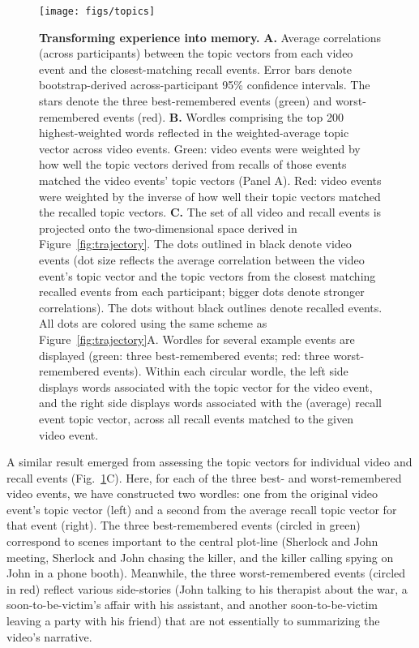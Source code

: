 \documentclass{article}
\begin{document}
\begin{figure}[tp]
\centering
\texttt{[image: figs/topics]}
\caption{\small \textbf{Transforming experience into memory.} \textbf{A.} Average correlations (across participants) between the topic vectors from each video event and the closest-matching recall events.  Error bars denote bootstrap-derived across-participant 95\% confidence intervals.  The stars denote the three best-remembered events (green) and worst-remembered events (red).  \textbf{B.} Wordles comprising the top 200 highest-weighted words reflected in the weighted-average topic vector across video events.  Green: video events were weighted by how well the topic vectors derived from recalls of those events matched the video events' topic vectors (Panel A).  Red: video events were weighted by the inverse of how well their topic vectors matched the recalled topic vectors.  \textbf{C.}  The set of all video and recall events is projected onto the two-dimensional space derived in Figure~\ref{fig:trajectory}.  The dots outlined in black denote video events (dot size reflects the average correlation between the video event's topic vector and the topic vectors from the closest matching recalled events from each participant; bigger dots denote stronger correlations).  The dots without black outlines denote recalled events.  All dots are colored using the same scheme as Figure~\ref{fig:trajectory}A.  Wordles for several example events are displayed (green: three best-remembered events; red: three worst-remembered events).  Within each circular wordle, the left side displays words associated with the topic vector for the video event, and the right side displays words associated with the (average) recall event topic vector, across all recall events matched to the given video event.}
\label{fig:topics}
\end{figure}

A similar result emerged from assessing the topic vectors for individual video and recall events (Fig.~\ref{fig:topics}C).  Here, for each of the three best- and worst-remembered video events, we have constructed two wordles: one from the original video event's topic vector (left) and a second from the average recall topic vector for that event (right).  The three best-remembered events (circled in green) correspond to scenes important to the central plot-line (Sherlock and John meeting, Sherlock and John chasing the killer, and the killer calling spying on John in a phone booth).  Meanwhile, the three worst-remembered events (circled in red) reflect various side-stories (John talking to his therapist about the war, a soon-to-be-victim's affair with his assistant, and another soon-to-be-victim leaving a party with his friend) that are not essentially to summarizing the video's narrative.
\end{document}
